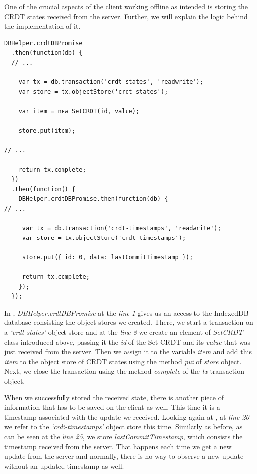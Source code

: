 One of the crucial aspects of the client working offline as intended is storing the CRDT states received from the server. Further, we will explain the logic behind the implementation of it.

\begin{lstlisting}[caption={[Caching on a client side CRDT states, received from the server]Storing CRDT states in the local database after a successful request from the server.}, label={lst:dev9}]
DBHelper.crdtDBPromise
  .then(function(db) {
  // ...

    var tx = db.transaction('crdt-states', 'readwrite');
    var store = tx.objectStore('crdt-states');

    var item = new SetCRDT(id, value);

    store.put(item);

// ...

    return tx.complete;
  })
  .then(function() {
    DBHelper.crdtDBPromise.then(function(db) {
// ...

     var tx = db.transaction('crdt-timestamps', 'readwrite');
     var store = tx.objectStore('crdt-timestamps');
     
     store.put({ id: 0, data: lastCommitTimestamp });

     return tx.complete;
    });
  });
\end{lstlisting}

In , \textit{DBHelper.crdtDBPromise} at the \textit{line 1} gives us an access to the IndexedDB database consisting the object stores we created. There, we start a transaction on a \textit{`crdt-states'} object store and at the \textit{line 8} we create an element of \textit{SetCRDT} class introduced above, passing it the \textit{id} of the Set CRDT and its \textit{value} that was just received from the server. Then we assign it to the variable \textit{item} and add this \textit{item} to the object store of CRDT states using the method \textit{put} of \textit{store} object. Next, we close the transaction using the method \textit{complete} of the \textit{tx} transaction object.

When we successfully stored the received state, there is another piece of information that has to be saved on the client as well. This time it is a timestamp associated with the update we received. Looking again at , at \textit{line 20} we refer to the \textit{`crdt-timestamps'} object store this time. Similarly as before, as can be seen at the \textit{line 25}, we store \textit{lastCommitTimestamp}, which consists the timestamp received from the server. That happens each time we get a new update from the server and normally, there is no way to observe a new update without an updated timestamp as well.



